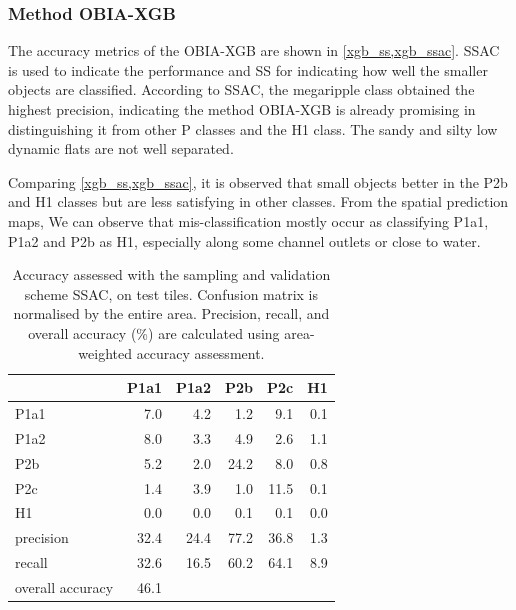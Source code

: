 \documentclass{isprs} %
\begin{document}
\subsubsection{Method OBIA-XGB}
The accuracy metrics of the OBIA-XGB are shown in \cref{xgb_ss,xgb_ssac}. SSAC is used to indicate the performance and SS for indicating how well the smaller objects are classified. According to SSAC, the megaripple class obtained the highest precision, indicating the method OBIA-XGB is already promising in distinguishing it from other P classes and the H1 class. The sandy and silty low dynamic flats are not well separated. 

Comparing \cref{xgb_ss,xgb_ssac}, it is observed that small objects better in the P2b and H1 classes but are less satisfying in other classes. From the spatial prediction maps, We can observe that mis-classification mostly occur as classifying P1a1, P1a2 and P2b as H1, especially along some channel outlets or close to water.

\begin{table}[]
    \centering
\begin{tabular}{lrrrrr}
\toprule
{} &  P1a1 &  P1a2 &  P2b &  P2c &  H1 \\
\midrule
P1a1             &   7.0 &   4.2 &  1.2 &  9.1 & 0.1 \\
P1a2             &   8.0 &   3.3 &  4.9 &  2.6 & 1.1 \\
P2b              &   5.2 &   2.0 & 24.2 &  8.0 & 0.8 \\
P2c              &   1.4 &   3.9 &  1.0 & 11.5 & 0.1 \\
H1               &   0.0 &   0.0 &  0.1 &  0.1 & 0.0 \\
precision        &  32.4 &  24.4 & 77.2 & 36.8 & 1.3 \\
recall           &  32.6 &  16.5 & 60.2 & 64.1 & 8.9 \\
overall accuracy &  46.1 &       &      &      &     \\
\bottomrule
\end{tabular}

\caption{Accuracy assessed with the sampling and validation scheme SSAC, on test tiles. Confusion matrix is normalised by the entire area. Precision, recall, and overall accuracy (\%) are calculated using area-weighted accuracy assessment. }

    \label{xgb_ssac}
\end{table}
\end{document}
